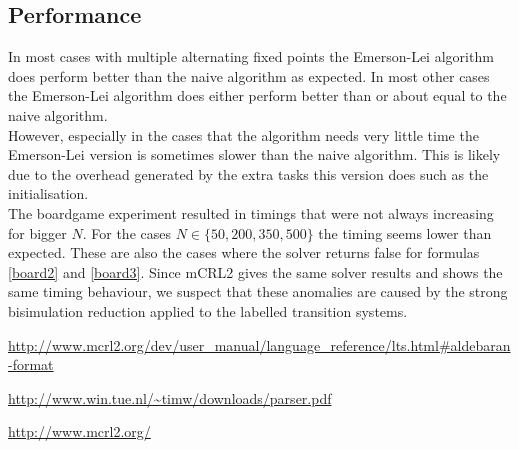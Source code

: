 \documentclass[10pt,a4paper]{article}
\begin{document}
\subsection{Performance}
In most cases with multiple alternating fixed points the Emerson-Lei algorithm does perform better than the naive algorithm as expected. In most other cases the Emerson-Lei algorithm does either perform better than or about equal to the naive algorithm.\\ However, especially in the cases that the algorithm needs very little time the Emerson-Lei version is sometimes slower than the naive algorithm. This is likely due to the overhead generated by the extra tasks this version does such as the initialisation.\\
The boardgame experiment resulted in timings that were not always increasing for bigger $N$. For the cases $N \in \{50, 200, 350, 500\}$ the timing seems lower than expected. These are also the cases where the solver returns false for formulas \ref{board2} and \ref{board3}. Since mCRL2 gives the same solver results and shows the same timing behaviour, we suspect that these anomalies are caused by the strong bisimulation reduction applied to the labelled transition systems.




\begin{thebibliography}{9}
	 \url{http://www.mcrl2.org/dev/user_manual/language_reference/lts.html#aldebaran-format}
	
	 \url{http://www.win.tue.nl/\~timw/downloads/parser.pdf}
	
	 \url{http://www.mcrl2.org/}
\end{thebibliography}


\newpage
\appendix
{}
  
\end{document}
